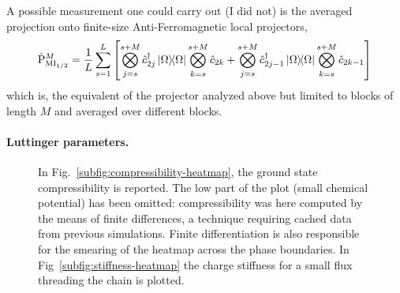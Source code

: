 A possible measurement one could carry out (I did not) is the averaged projection onto finite-size Anti-Ferromagnetic local projectors,
\[
	\hat{\mathrm{P}}_{\mathrm{MI}_{1/2}}^M =
	\frac{1}{L} \sum_{s=1}^{L}
		\left[
			\bigotimes_{j=s}^{s+M} \hat c_{2j}^\dagger \op{\Omega}{\Omega} \bigotimes_{k=s}^{s+M} \hat c_{2k}
			+
			\bigotimes_{j=s}^{s+M} \hat c_{2j-1}^\dagger \op{\Omega}{\Omega} \bigotimes_{k=s}^{s+M} \hat c_{2k-1}
		\right]
\]
which is, the equivalent of the projector analyzed above but limited to blocks of length $M$ and averaged over different blocks.

\paragraph{Luttinger parameters.} 

\begin{figure}
	\centering	
	\caption{In Fig.~\ref{subfig:compressibility-heatmap}, the ground state compressibility is reported. The low part of the plot (small chemical potential) has been omitted: compressibility was here computed by the means of finite differences, a technique requiring cached data from previous simulations. Finite differentiation is also responsible for the smearing of the heatmap across the phase boundaries. In Fig~\ref{subfig:stiffness-heatmap} the charge stiffness for a small flux threading the chain is plotted.}
\end{figure}

